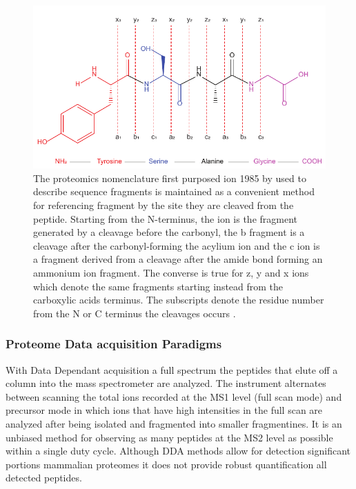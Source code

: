 \documentclass[a4paper,11pt,twoside]{book}
\begin{document}
	
	\begin{figure}
		\centering
		\includegraphics[width=0.6\linewidth]{3.Proteomics/peptide_frags.pdf}
        \caption{The proteomics nomenclature first purposed ion 1985 by \citep{Roepstorff1984LetterEditors} used to describe sequence fragments is maintained as a convenient method for referencing fragment by the site they are cleaved from the peptide. Starting from the N-terminus, the ion is the fragment generated by a cleavage before the carbonyl, the b fragment is a cleavage after the carbonyl-forming the acylium ion and the c ion is a fragment derived from a cleavage after the amide bond forming an ammonium ion fragment. The converse is true for z, y and x ions which denote the same fragments starting instead from the carboxylic acids terminus. The subscripts denote the residue number from the N or C terminus the cleavages occurs \citep{Roepstorff1984LetterEditors}.}
		\label{Tri_peptide_seq}
	\end{figure}
	
	
	\subsubsection{Proteome Data acquisition Paradigms}
	
    With Data Dependant acquisition a full spectrum the peptides that elute off a column into the mass spectrometer are analyzed. The instrument alternates between scanning the total ions recorded at the MS1 level (full scan mode) and precursor mode in which ions that have high intensities in the full scan are analyzed after being isolated and fragmented into smaller fragmentines\citep{Bateman2014MaximizingDDA.}. It is an unbiased method for observing as many peptides at the MS2 level as possible within a single duty cycle. Although DDA methods allow for detection significant portions mammalian proteomes it does not provide robust quantification all detected peptides\citep{Richards2015ProteomeDeep.}.
	
\end{document}
